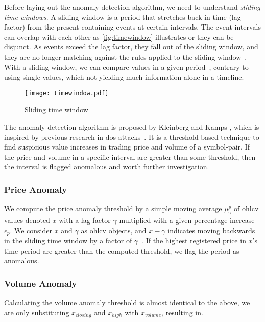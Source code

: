 Before laying out the anomaly detection algorithm, we need to understand \emph{sliding time windows}. A sliding window is a period that stretches back in time (lag factor) from the present containing events at certain intervals. The event intervals can overlap with each other as \autoref{fig:timewindow} illustrates or they can be disjunct. As events exceed the lag factor, they fall out of the sliding window, and they are no longer matching against the rules applied to the sliding window~\cite{redhat}. With a sliding window, we can compare values in a given period~\cite{P&D_to_the_moon}, contrary to using single values, which not yielding much information alone in a timeline. 
\begin{figure}[ht]
    \centering
    \texttt{[image: timewindow.pdf]}
    \caption{Sliding time window}
    \label{fig:timewindow}
\end{figure}

The anomaly detection algorithm is proposed by Kleinberg and Kamps \cite{P&D_to_the_moon}, which is inspired by previous research in \ac{dos} attacks~\cite{dos}. It is a threshold based technique to find suspicious value increases in trading price and volume of a symbol-pair. If the price and volume in a specific interval are greater than some threshold, then the interval is flagged anomalous and worth further investigation.

\subsubsection{Price Anomaly}
We compute the price anomaly threshold by a simple moving average $\mu_\gamma^p$ of \ac{ohlcv} values denoted $x$ with a lag factor $\gamma$ multiplied with a given percentage increase $\epsilon_p$. We consider $x$ and $\gamma$ as \ac{ohlcv} objects, and $x-\gamma$ indicates moving backwards in the sliding time window by a factor of $\gamma$~\cite{P&D_to_the_moon}. If the highest registered price in $x$'s time period are greater than the computed threshold, we flag the period as anomalous.


\subsubsection{Volume Anomaly}
Calculating the volume anomaly threshold is almost identical to the above, we are only substituting $x_{closing}$ and $x_{high}$ with $x_{volume}$, resulting in.  


